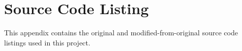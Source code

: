 
\chapter{Source Code Listing} %
This appendix contains the original and modified-from-original source code listings used in this project. 
\label{app:source_code_listing}

